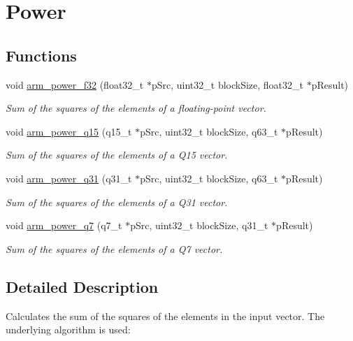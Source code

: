 \hypertarget{group__power}{\section{Power}
\label{group__power}
}
\subsection*{Functions}
\begin{DoxyCompactItemize}
\item 
void \hyperlink{group__power_ga993c00dd7f661d66bdb6e58426e893aa}{arm\-\_\-power\-\_\-f32} (float32\-\_\-t $\ast$p\-Src, uint32\-\_\-t block\-Size, float32\-\_\-t $\ast$p\-Result)
\begin{DoxyCompactList}\small\item\em Sum of the squares of the elements of a floating-\/point vector. \end{DoxyCompactList}\item 
void \hyperlink{group__power_ga7050c04b7515e01a75c38f1abbaf71ba}{arm\-\_\-power\-\_\-q15} (q15\-\_\-t $\ast$p\-Src, uint32\-\_\-t block\-Size, q63\-\_\-t $\ast$p\-Result)
\begin{DoxyCompactList}\small\item\em Sum of the squares of the elements of a Q15 vector. \end{DoxyCompactList}\item 
void \hyperlink{group__power_ga0b93d31bb5b5ed214c2b94d8a7744cd2}{arm\-\_\-power\-\_\-q31} (q31\-\_\-t $\ast$p\-Src, uint32\-\_\-t block\-Size, q63\-\_\-t $\ast$p\-Result)
\begin{DoxyCompactList}\small\item\em Sum of the squares of the elements of a Q31 vector. \end{DoxyCompactList}\item 
void \hyperlink{group__power_gaf969c85c5655e3d72d7b99ff188f92c9}{arm\-\_\-power\-\_\-q7} (q7\-\_\-t $\ast$p\-Src, uint32\-\_\-t block\-Size, q31\-\_\-t $\ast$p\-Result)
\begin{DoxyCompactList}\small\item\em Sum of the squares of the elements of a Q7 vector. \end{DoxyCompactList}\end{DoxyCompactItemize}


\subsection{Detailed Description}
Calculates the sum of the squares of the elements in the input vector. The underlying algorithm is used\-:


